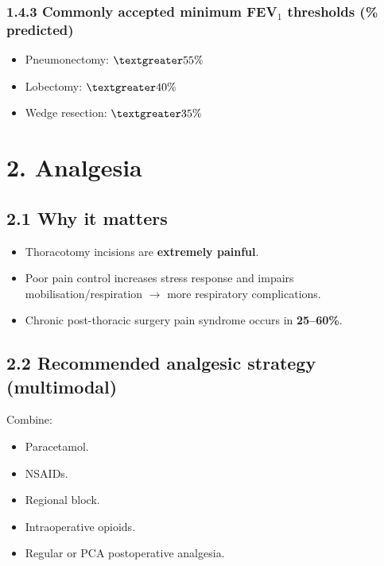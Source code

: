 \documentclass[11pt,a4paper]{article}
\begin{document}
\subsubsection{1.4.3 Commonly accepted minimum FEV\(_1\) thresholds (\% predicted)}
\begin{itemize}[leftmargin=*, itemsep=2pt]
  \item Pneumonectomy: \(\textgreater 55\%\)
  \item Lobectomy: \(\textgreater 40\%\)
  \item Wedge resection: \(\textgreater 35\%\)
\end{itemize}

\section{2. Analgesia}

\subsection{2.1 Why it matters}
\begin{itemize}[leftmargin=*, itemsep=2pt]
  \item Thoracotomy incisions are \textbf{extremely painful}.
  \item Poor pain control increases stress response and impairs mobilisation/respiration \(\rightarrow\) more respiratory complications.
  \item Chronic post-thoracic surgery pain syndrome occurs in \textbf{25--60\%}.
\end{itemize}

\subsection{2.2 Recommended analgesic strategy (multimodal)}
Combine:
\begin{itemize}[leftmargin=*, itemsep=2pt]
  \item Paracetamol.
  \item NSAIDs.
  \item Regional block.
  \item Intraoperative opioids.
  \item Regular or PCA postoperative analgesia.
\end{itemize}
\end{document}
